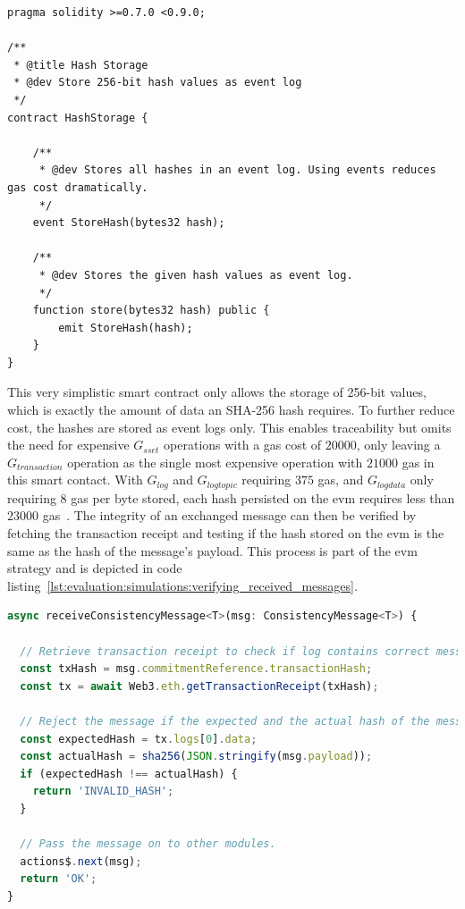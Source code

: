 \begin{lstlisting}[language=Solidity,caption=Implementation of a smart contract that stores message hashes,captionpos=b,label=lst:evaluation:simulations:hash_storage]
pragma solidity >=0.7.0 <0.9.0;

/**
 * @title Hash Storage
 * @dev Store 256-bit hash values as event log
 */
contract HashStorage {

    /**
     * @dev Stores all hashes in an event log. Using events reduces gas cost dramatically.
     */
    event StoreHash(bytes32 hash);

    /**
     * @dev Stores the given hash values as event log.
     */
    function store(bytes32 hash) public {
        emit StoreHash(hash);
    }
}
\end{lstlisting}

This very simplistic smart contract only allows the storage of 256-bit values, which is exactly the amount of data an SHA-256 hash requires. To further reduce cost, the hashes are stored as event logs only. This enables traceability but omits the need for expensive $G_{sset}$ operations with a gas cost of $20000$, only leaving a $G_{transaction}$ operation as the single most expensive operation with $21000$ gas in this smart contact. With $G_{log}$ and $G_{logtopic}$ requiring $375$ gas, and $G_{logdata}$ only requiring $8$ gas per byte stored, each hash persisted on the \gls{evm} requires less than $23000$ gas~\cite{ethereum_yellow_paper}. The integrity of an exchanged message can then be verified by fetching the transaction receipt and testing if the hash stored on the \gls{evm} is the same as the hash of the message's payload. This process is part of the \gls{evm} strategy and is depicted in code listing~\ref{lst:evaluation:simulations:verifying_received_messages}.\\ %

\begin{lstlisting}[language=JavaScript,caption=Implementation of the verification process of messages received,captionpos=b,label=lst:evaluation:simulations:verifying_received_messages]
async receiveConsistencyMessage<T>(msg: ConsistencyMessage<T>) {

  // Retrieve transaction receipt to check if log contains correct message hash.
  const txHash = msg.commitmentReference.transactionHash;
  const tx = await Web3.eth.getTransactionReceipt(txHash);

  // Reject the message if the expected and the actual hash of the message payload differ.
  const expectedHash = tx.logs[0].data;
  const actualHash = sha256(JSON.stringify(msg.payload));
  if (expectedHash !== actualHash) {
    return 'INVALID_HASH';
  }

  // Pass the message on to other modules.
  actions$.next(msg);
  return 'OK';
}
\end{lstlisting}

